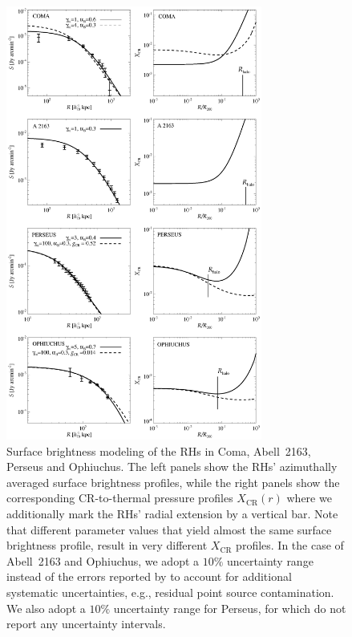 \documentclass[traditabstract]{aa}
\newcommand{\rmn}{\mathrm}
\begin{document}
\begin{figure}[t!]
\centering
\includegraphics[width=0.75\textwidth]{figures/SB_profiles_ALL.eps}
\caption{Surface brightness modeling of the RHs in Coma, Abell~2163, Perseus and
  Ophiuchus. The left panels show the RHs' azimuthally averaged surface
  brightness profiles, while the right panels show the corresponding
  CR-to-thermal pressure profiles $X_{\rmn{CR}}(r)$ where we additionally mark
  the RHs' radial extension by a vertical bar.  Note that different parameter
  values that yield almost the same surface brightness profile, result in very
  different $X_{\rmn{CR}}$ profiles. In the case of Abell~2163 and Ophiuchus, we
  adopt a $10\%$ uncertainty range instead of the errors reported by
  \cite{2009A&A...499..679M} to account for additional systematic uncertainties,
  e.g., residual point source contamination. We also adopt a $10\%$ uncertainty
  range for Perseus, for which \cite{1990MNRAS.246..477P} do not report any
  uncertainty intervals.}
\label{fig:SBmodeling}
\end{figure}
\end{document}
